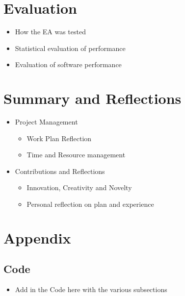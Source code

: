 \documentclass[a4paper]{article}
\begin{document}
\section{Evaluation}
\begin{itemize}
	\item How the EA was tested
	\item Statistical evaluation of performance
	\item Evaluation of software performance
\end{itemize}

\section{Summary and Reflections}
\begin{itemize}
	\item Project Management \begin{itemize}
		\item Work Plan Reflection
		\item Time and Resource management
	\end{itemize}
	\item Contributions and Reflections \begin{itemize}
		\item Innovation, Creativity and Novelty
		\item Personal reflection on plan and experience
	\end{itemize}
\end{itemize}

\pagebreak
\section{Appendix}
\subsection{Code} %
\begin{itemize}
	\item Add in the Code here with the various subsections
\end{itemize}
\end{document}
